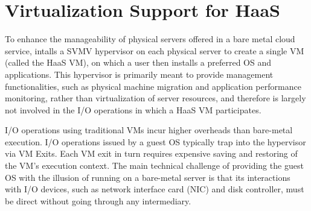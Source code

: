 \section{Virtualization Support for HaaS}



To enhance the manageability of physical servers offered in a bare metal cloud service, \na intalls 
a SVMV  hypervisor on each physical server  to create a single VM (called the HaaS VM), on which 
a \na user then installs a preferred OS 
and applications. 
This  hypervisor is primarily meant to provide management functionalities, such as 
physical machine migration and application performance monitoring, rather than virtualization 
of server resources, and therefore is largely not involved in the I/O operations in which a HaaS VM participates.

I/O operations using traditional VMs incur higher overheads than bare-metal execution. 
I/O operations issued by a guest OS typically trap into the hypervisor via VM Exits. 
Each VM exit in turn requires expensive saving and restoring of the VM's execution context.
The main technical challenge of providing the guest OS with the illusion of running on 
a bare-metal server is that its interactions with I/O devices, such as network 
interface card (NIC) and disk controller, must be direct without going through any intermediary.

